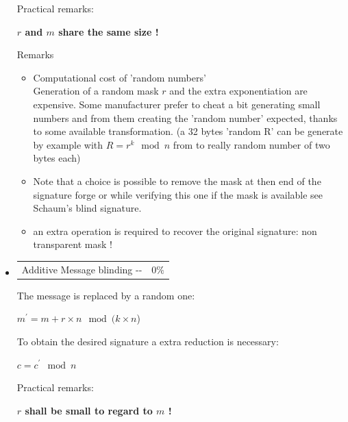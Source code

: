 \begin{itemize}
		Practical remarks: 
		\begin{center}
			\textbf{$r$ and $m$ share the same size !}
		\end{center}

		\newpage
		Remarks
		\begin{itemize}
			\item Computational cost of 'random numbers'\\
		Generation of a random mask $r$	and the extra exponentiation are expensive.
		Some manufacturer prefer to cheat a bit generating small numbers and from 
		them creating the 'random number' expected, thanks to some available transformation.
		(a 32 bytes 'random R' can be generate by example with $R = r^k \mod n$ from to 
		really random number of two bytes each)
		
			\item Note that a choice is possible to remove the mask at then 
			end of the signature forge or while verifying this one if the mask is available see Schaum's blind signature.
			
			\item an extra operation is required to recover the original signature: non transparent mask !		
		\end{itemize}
		
\item	\begin{tabularx}{\linewidth}{ p{16cm} p{1.5cm}}
		Additive Message blinding -\textit{}-  & $0\%$ \\ 
		\end{tabularx}	
		\noindent 
		The message is replaced by a random one:
		\begin{center}
			$m^{'} = m + r \times n \mod( k \times n$)\\
		\end{center}
		To obtain the desired signature a extra reduction is necessary:
		\begin{center}
			$ c = c^{'} \mod n$
		\end{center}
		
		Practical remarks: 
		\begin{center}
			\textbf{$r$ shall be small to regard to $m$ !}
		\end{center}
		

\end{itemize}
